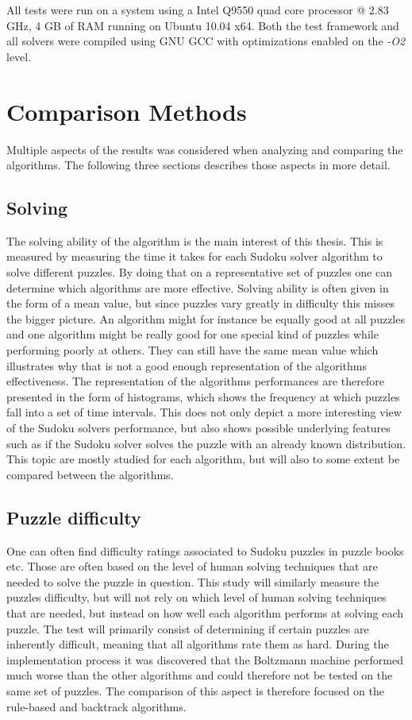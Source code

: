 \documentclass[a4paper,11pt]{kth-mag}
\begin{document}
All tests were run on a system using a Intel Q9550 quad core processor @ 2.83 GHz, 4 GB of RAM running on Ubuntu 10.04 x64.
Both the test framework and all solvers were compiled using GNU GCC with optimizations enabled on the \emph{-O2} level.

\FloatBarrier
\section{Comparison Methods}
\label{sec:comparisonMethod}
Multiple aspects of the results was considered when analyzing and comparing the algorithms. The following three sections describes those aspects in more detail. 

\FloatBarrier
\subsection{Solving}
The solving ability of the algorithm is the main interest of this thesis.
This is measured by measuring the time it takes for each Sudoku solver algorithm to solve different puzzles.
By doing that on a representative set of puzzles one can determine which algorithms are more effective.
Solving ability is often given in the form of a mean value, but since puzzles vary greatly in difficulty this misses the bigger picture.
An algorithm might for instance be equally good at all puzzles and one algorithm might be really good for one special kind of puzzles while performing poorly at others.
They can still have the same mean value which illustrates why that is not a good enough representation of the algorithms effectiveness.
The representation of the algorithms performances are therefore presented in the form of histograms, which shows the frequency at which puzzles fall into a set of time intervals.
This does not only depict a more interesting view of the Sudoku solvers performance, but also shows possible underlying features such as if the Sudoku solver solves the puzzle with an already known distribution.
This topic are mostly studied for each algorithm, but will also to some extent be compared between the algorithms.

\FloatBarrier
\subsection{Puzzle difficulty}
\label{sec:puzzleDifficulty}
One can often find difficulty ratings associated to Sudoku puzzles in puzzle books etc. 
Those are often based on the level of human solving techniques that are needed to solve the puzzle in question.
This study will similarly measure the puzzles difficulty, but will not rely on which level of human solving techniques that are needed, but instead on how well each algorithm performs at solving each puzzle. 
The test will primarily consist of determining if certain puzzles are inherently difficult, meaning that all algorithms rate them as hard.
During the implementation process it was discovered that the Boltzmann machine performed much worse than the other algorithms and could therefore not be tested on the same set of puzzles.
The comparison of this aspect is therefore focused on the rule-based and backtrack algorithms.
\end{document}
